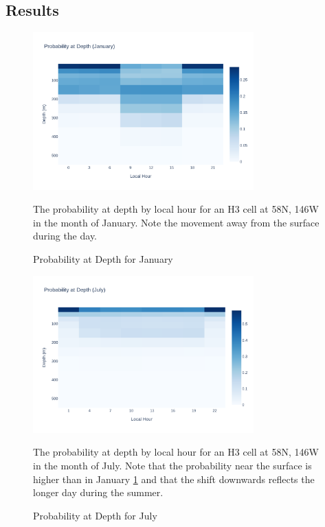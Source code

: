 \documentclass[11pt]{article}
\begin{document}
\subsection{Results}
\begin{figure}[h] 
\begin{center}
  \includegraphics[width=85mm]{images/jan_prob_depth.png}
 \end{center}
  \caption{Probability at Depth for January}
  \medskip
	\small
	The probability at depth by local hour for an H3 cell at 58N, 146W in the month of January. Note the movement away from the surface during the day.
  \label{fig:jan_prob}
\end{figure}

\begin{figure}[h] 
\begin{center}
  \includegraphics[width=85mm]{images/jul_prob_depth.png}
  
\end{center}
  \caption{Probability at Depth for July}
  \medskip
	\small
	The probability at depth by local hour for an H3 cell at 58N, 146W in the month of July. Note that the probability near the surface is higher than in January \ref{fig:jan_prob} and that the shift downwards reflects the longer day during the summer.
  \label{fig:jul_prob}
\end{figure}
\end{document}
